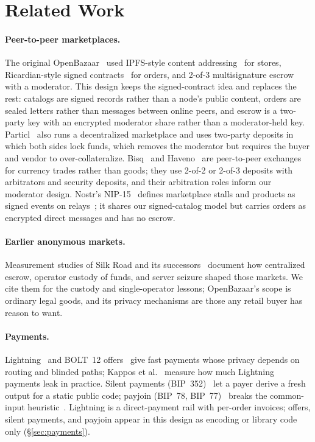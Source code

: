 \section{Related Work}
\label{sec:related}

\paragraph{Peer-to-peer marketplaces.} The original OpenBazaar~\citep{openbazaargo} used IPFS-style content addressing~\citep{ipfs} for stores, Ricardian-style signed contracts~\citep{grigg2004ricardian} for orders, and 2-of-3 multisignature escrow with a moderator. This design keeps the signed-contract idea and replaces the rest: catalogs are signed records rather than a node's public content, orders are sealed letters rather than messages between online peers, and escrow is a two-party key with an encrypted moderator share rather than a moderator-held key. Particl~\citep{particl} also runs a decentralized marketplace and uses two-party deposits in which both sides lock funds, which removes the moderator but requires the buyer and vendor to over-collateralize. Bisq~\citep{bisq} and Haveno~\citep{haveno} are peer-to-peer exchanges for currency trades rather than goods; they use 2-of-2 or 2-of-3 deposits with arbitrators and security deposits, and their arbitration roles inform our moderator design. Nostr's NIP-15~\citep{nip15} defines marketplace stalls and products as signed events on relays~\citep{nip01}; it shares our signed-catalog model but carries orders as encrypted direct messages and has no escrow.

\paragraph{Earlier anonymous markets.} Measurement studies of Silk Road and its successors~\citep{christin2013silkroad,soska2015measuring} document how centralized escrow, operator custody of funds, and server seizure shaped those markets. We cite them for the custody and single-operator lessons; OpenBazaar's scope is ordinary legal goods, and its privacy mechanisms are those any retail buyer has reason to want.

\paragraph{Payments.} Lightning~\citep{poon2016} and BOLT~12 offers~\citep{bolt12} give fast payments whose privacy depends on routing and blinded paths; Kappos et al.~\citep{kappos2021lightning} measure how much Lightning payments leak in practice. Silent payments (BIP~352)~\citep{bip352} let a payer derive a fresh output for a static public code; payjoin (BIP~78, BIP~77)~\citep{bip78,bip77} breaks the common-input heuristic~\citep{meiklejohn2013fistful}. Lightning is a direct-payment rail with per-order invoices; offers, silent payments, and payjoin appear in this design as encoding or library code only (\S\ref{sec:payments}).

